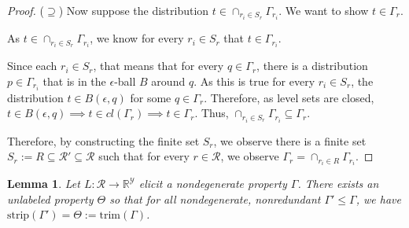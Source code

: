\documentclass[12pt]{article}
\newcommand{\reals}{\mathbb{R}}
\newcommand{\R}{\mathcal{R}}
\newcommand{\Y}{\mathcal{Y}}
\newcommand{\strip}{\text{strip}}
\newtheorem{lemma}{Lemma}
\begin{document}
\begin{proof}
\bigskip 
($\supseteq$)  Now suppose the distribution $t \in \cap_{r_i \in S_r}\Gamma_{r_i}$.
We want to show $t \in \Gamma_r$.

As $t \in \cap_{r_i \in S_r}\Gamma_{r_i}$, we know for every $r_i \in S_r$ that $t \in \Gamma_{r_i}$.

Since each $r_i \in S_r$, that means that for every $q \in \Gamma_r$, there is a distribution $p \in \Gamma_{r_i}$ that is in the $\epsilon$-ball $B$ around $q$.
As this is true for every $r_i \in S_r$, the distribution $t \in B(\epsilon, q)$ for some $q \in \Gamma_r$. 
Therefore, as level sets are closed, $t \in B(\epsilon, q) \implies t \in cl(\Gamma_r) \implies t \in \Gamma_r$.
Thus, $\cap_{r_i \in S_r}\Gamma_{r_i} \subseteq \Gamma_r$.

Therefore, by constructing the finite set $S_r$, we observe there is a finite set $S_r := R \subseteq \R' \subseteq \R$ such that for every $r \in \R$, we observe $\Gamma_r = \cap_{r_i \in R}\Gamma_{r_i}$.

\end{proof}


\begin{lemma}\label{lem:define-trim}
	Let $L: \R \to \reals^\Y$ elicit a nondegenerate property $\Gamma$.
	There exists an unlabeled property $\Theta$ so that for all nondegenerate, nonredundant $\Gamma' \leq \Gamma$, we have $\strip(\Gamma') = \Theta := \text{trim}(\Gamma)$.
\end{lemma}
\end{document}
